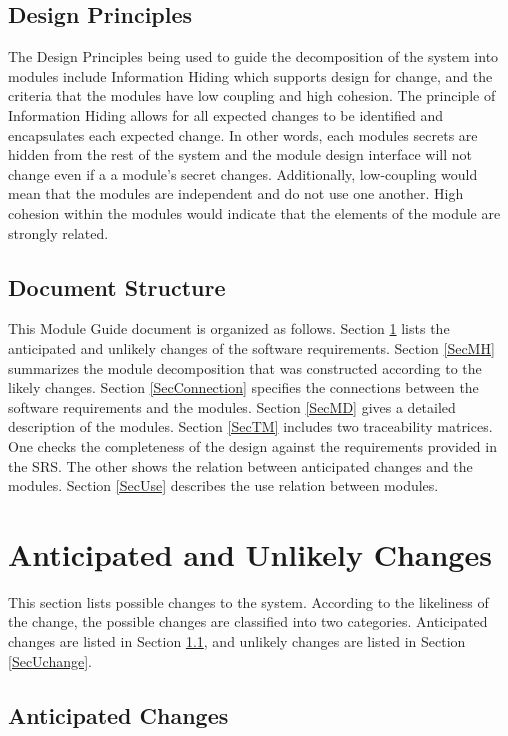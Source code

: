 \documentclass[12pt, titlepage]{article}
\begin{document}
\subsection{Design Principles}

The Design Principles being used to guide the decomposition of the system into modules include Information Hiding which supports design for change, and the criteria that the modules have low coupling and high cohesion. The principle of Information Hiding allows for all expected changes to be identified and encapsulates each expected change. In other words, each modules secrets are hidden from the rest of the system and the module design interface will not change even if a a module's secret changes. Additionally, low-coupling would mean that the modules are independent and do not use one another. High cohesion within the modules would indicate that the elements of the module are strongly related. 

\subsection{Document Structure}

This Module Guide document is organized as follows. Section
\ref{SecChange} lists the anticipated and unlikely changes of the software
requirements. Section \ref{SecMH} summarizes the module decomposition that
was constructed according to the likely changes. Section \ref{SecConnection}
specifies the connections between the software requirements and the
modules. Section \ref{SecMD} gives a detailed description of the
modules. Section \ref{SecTM} includes two traceability matrices. One checks
the completeness of the design against the requirements provided in the SRS. The
other shows the relation between anticipated changes and the modules. Section
\ref{SecUse} describes the use relation between modules.

\section{Anticipated and Unlikely Changes} \label{SecChange}

This section lists possible changes to the system. According to the likeliness
of the change, the possible changes are classified into two
categories. Anticipated changes are listed in Section \ref{SecAchange}, and
unlikely changes are listed in Section \ref{SecUchange}.

\subsection{Anticipated Changes} \label{SecAchange}
\end{document}
